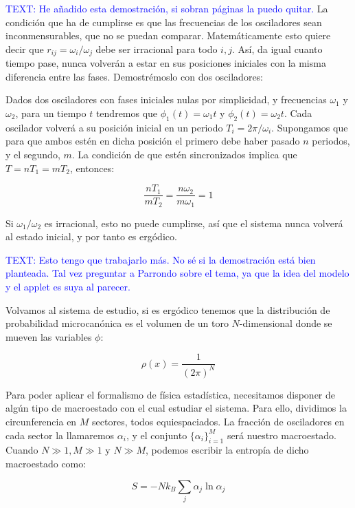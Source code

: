\documentclass[11pt, a4paper]{article} %
\theoremstyle{named}
\begin{document}
        \textcolor{blue}{TEXT: He añadido esta demostración, si sobran páginas la puedo quitar.} La condición que ha de cumplirse es que las frecuencias de los osciladores sean inconmensurables, que no se puedan comparar. Matemáticamente esto quiere decir que $r_{ij}={\omega_i}/{\omega_j}$ debe ser irracional para todo $i, j$. Así, da igual cuanto tiempo pase, nunca volverán a estar en sus posiciones iniciales con la misma diferencia entre las fases. Demostrémoslo con dos osciladores:

        Dados dos osciladores con fases iniciales nulas por simplicidad, y frecuencias $\omega_1$ y $\omega_2$, para un tiempo $t$ tendremos que $\phi_1(t) =  \omega_1 t$ y $\phi_2(t) = \omega_2 t$. Cada oscilador volverá a su posición inicial en un periodo $T_i = 2\pi / \omega_i$. Supongamos que para que ambos estén en dicha posición el primero debe haber pasado $n$ periodos, y el segundo, $m$. La condición de que estén sincronizados implica que $T = nT_1 = mT_2$, entonces:

        $$
        \frac{nT_1}{mT_2} = \frac{n \omega_2}{m \omega_1} = 1
        $$

        Si $\omega_1 / \omega_2$ es irracional, esto no puede cumplirse, así que el sistema nunca volverá al estado inicial, y por tanto es ergódico.

        \textcolor{blue}{TEXT: Esto tengo que trabajarlo más. No sé si la demostración está bien planteada. Tal vez preguntar a Parrondo sobre el tema, ya que la idea del modelo y el applet es suya al parecer.}

        Volvamos al sistema de estudio, si es ergódico tenemos que la distribución de probabilidad microcanónica es el volumen de un toro $N$-dimensional donde se mueven las variables $\phi$:

        $$
        \rho (x) = \frac{1}{(2\pi)^N}
        $$

        Para poder aplicar el formalismo de física estadística, necesitamos disponer de algún tipo de macroestado con el cual estudiar el sistema. Para ello, dividimos la circunferencia en $M$ sectores, todos equiespaciados. La fracción de osciladores en cada sector la llamaremos $\alpha_i$, y el conjunto $\{\alpha_i\}_{i=1}^M$ será nuestro macroestado.
        Cuando $N \gg 1, M \gg 1$ y $N \gg M$, podemos escribir la entropía de dicho macroestado como:

        \begin{equation}\label{eq:oscS}
        S=-N k_{B} \sum_{j} \alpha_{j} \ln \alpha_{j}
        \end{equation}
\end{document}
